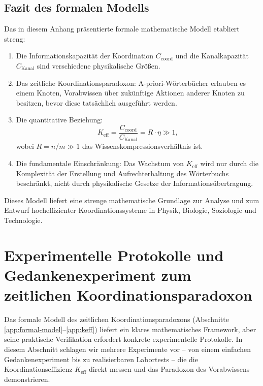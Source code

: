 \documentclass[12pt]{article}
\begin{document}
	\subsection{Fazit des formalen Modells}
	
	Das in diesem Anhang präsentierte formale mathematische Modell etabliert streng:
	
	\begin{enumerate}
		\item Die Informationskapazität der Koordination $C_{\text{coord}}$ und die Kanalkapazität $C_{\text{Kanal}}$ sind verschiedene physikalische Größen.
		
		\item Das zeitliche Koordinationsparadoxon: A-priori-Wörterbücher erlauben es einem Knoten, Vorabwissen über zukünftige Aktionen anderer Knoten zu besitzen, bevor diese tatsächlich ausgeführt werden.
		
		\item Die quantitative Beziehung:
		\[
		K_{\mathrm{eff}} = \frac{C_{\text{coord}}}{C_{\text{Kanal}}} = R \cdot \eta \gg 1,
		\]
		wobei $R = n/m \gg 1$ das Wissenskompressionsverhältnis ist.
		
		\item Die fundamentale Einschränkung: Das Wachstum von $K_{\mathrm{eff}}$ wird nur durch die Komplexität der Erstellung und Aufrechterhaltung des Wörterbuchs beschränkt, nicht durch physikalische Gesetze der Informationsübertragung.
	\end{enumerate}
	
	Dieses Modell liefert eine strenge mathematische Grundlage zur Analyse und zum Entwurf hocheffizienter Koordinationssysteme in Physik, Biologie, Soziologie und Technologie.
	
	
	\section{Experimentelle Protokolle und Gedankenexperiment zum zeitlichen Koordinationsparadoxon}
	\label{app:experimental-protocols}
	
	Das formale Modell des zeitlichen Koordinationsparadoxons (Abschnitte \ref{app:formal-model}--\ref{app:keff}) liefert ein klares mathematisches Framework, aber seine praktische Verifikation erfordert konkrete experimentelle Protokolle. In diesem Abschnitt schlagen wir mehrere Experimente vor – von einem einfachen Gedankenexperiment bis zu realisierbaren Labortests – die die Koordinationseffizienz \(K_{\mathrm{eff}}\) direkt messen und das Paradoxon des Vorabwissens demonstrieren.
	
\end{document}
